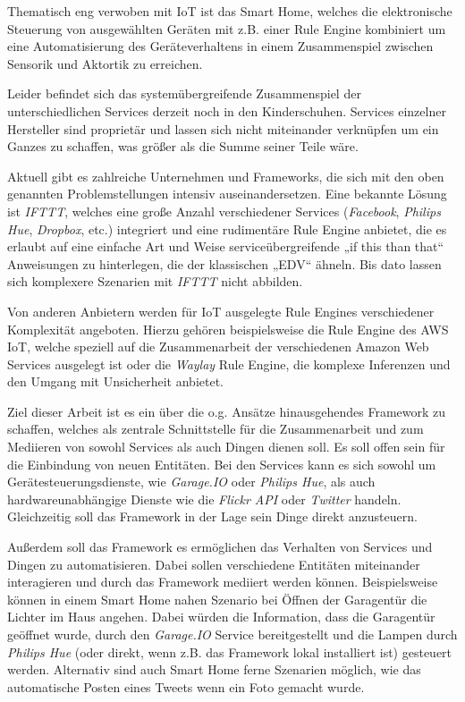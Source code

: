 \documentclass[12pt]{article}
\begin{document}
Thematisch eng verwoben mit IoT ist das Smart Home, welches die elektronische Steuerung von ausgewählten Geräten mit z.B. einer Rule Engine kombiniert um eine Automatisierung des Geräteverhaltens in einem Zusammenspiel zwischen Sensorik und Aktortik zu erreichen.
 
Leider befindet sich das systemübergreifende Zusammenspiel der unterschiedlichen Services derzeit noch in den Kinderschuhen. Services einzelner Hersteller sind proprietär und lassen sich nicht miteinander verknüpfen um ein Ganzes zu schaffen, was größer als die Summe seiner Teile wäre.

Aktuell gibt es zahlreiche Unternehmen und Frameworks, die sich mit den oben genannten Problemstellungen intensiv auseinandersetzen. Eine bekannte Lösung ist \textit{IFTTT}, welches eine große Anzahl verschiedener Services (\textit{Facebook}, \textit{Philips Hue}, \textit{Dropbox}, etc.) integriert und eine rudimentäre Rule Engine anbietet, die es erlaubt auf eine einfache Art und Weise serviceübergreifende „if this than that“ Anweisungen zu hinterlegen, die der klassischen „EDV“ ähneln. Bis dato lassen sich komplexere Szenarien mit \textit{IFTTT} nicht abbilden. 

Von anderen Anbietern werden für IoT ausgelegte Rule Engines verschiedener Komplexität angeboten. Hierzu gehören beispielsweise die Rule Engine des AWS IoT, welche speziell auf die Zusammenarbeit der verschiedenen Amazon Web Services ausgelegt ist oder die \textit{Waylay} Rule Engine, die komplexe Inferenzen und den Umgang mit Unsicherheit anbietet.

Ziel dieser Arbeit ist es ein über die o.g. Ansätze hinausgehendes Framework zu schaffen, welches als zentrale Schnittstelle für die Zusammenarbeit und zum Mediieren von sowohl Services als auch Dingen dienen soll. Es soll offen sein für die Einbindung von neuen Entitäten. Bei den Services kann es sich sowohl um Gerätesteuerungsdienste, wie \textit{Garage.IO} oder \textit{Philips Hue}, als auch hardwareunabhängige Dienste wie die \textit{Flickr API} oder \textit{Twitter} handeln. Gleichzeitig soll das Framework in der Lage sein Dinge direkt anzusteuern.

Außerdem soll das Framework es ermöglichen das Verhalten von Services und Dingen zu automatisieren. Dabei sollen verschiedene Entitäten miteinander interagieren und durch das Framework mediiert werden können. Beispielsweise können in einem Smart Home nahen Szenario bei Öffnen der Garagentür die Lichter im Haus angehen. Dabei würden die Information, dass die Garagentür geöffnet wurde, durch den \textit{Garage.IO} Service bereitgestellt und die Lampen durch \textit{Philips Hue} (oder direkt, wenn z.B. das Framework lokal installiert ist) gesteuert werden. Alternativ sind auch Smart Home ferne Szenarien möglich, wie das automatische Posten eines Tweets wenn ein Foto gemacht wurde. 
\end{document}
